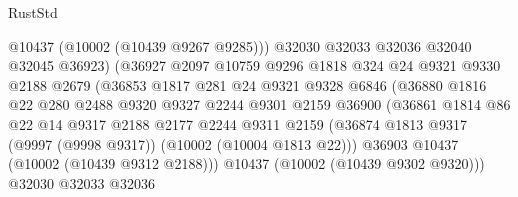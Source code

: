 \begin{lexlean}{RustStd}
\begin{coremodule}
                                  @10437
                                  (@10002 (@10439 @9267 @9285)))
                                @32030
                                @32033
                                @32036
                                @32040
                                @32045
                                @36923)
                              (@36927
                                @2097
                                @10759
                                @9296
                                @1818
                                @324
                                @24
                                @9321
                                @9330
                                @2188
                                @2679
                                (@36853
                                  @1817
                                  @281
                                  @24
                                  @9321
                                  @9328
                                  @6846
                                  (@36880
                                    @1816
                                    @22
                                    @280
                                    @2488
                                    @9320
                                    @9327
                                    @2244
                                    @9301
                                    @2159
                                    @36900
                                    (@36861
                                      @1814
                                      @86
                                      @22
                                      @14
                                      @9317
                                      @2188
                                      @2177
                                      @2244
                                      @9311
                                      @2159
                                      (@36874
                                        @1813
                                        @9317
                                        (@9997 (@9998 @9317))
                                        (@10002 (@10004 @1813 @22)))
                                      @36903
                                      @10437
                                      (@10002 (@10439 @9312 @2188)))
                                    @10437
                                    (@10002 (@10439 @9302 @9320)))
                                  @32030
                                  @32033
                                  @32036

\end{coremodule}
\end{lexlean}

